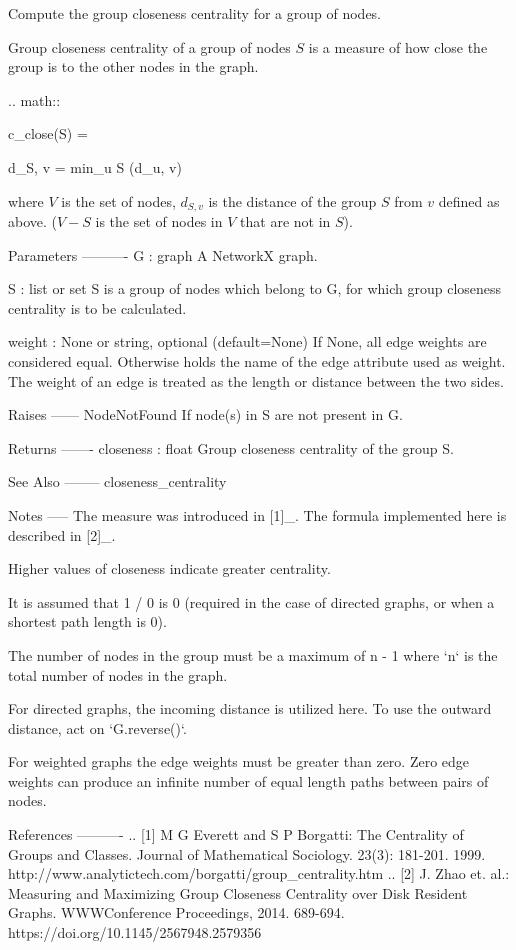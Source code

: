 \begin{DoxyVerb}Compute the group closeness centrality for a group of nodes.

Group closeness centrality of a group of nodes $S$ is a measure
of how close the group is to the other nodes in the graph.

.. math::

   c_{close}(S) = 

   d_{S, v} = min_{u \in S} (d_{u, v})

where $V$ is the set of nodes, $d_{S, v}$ is the distance of
the group $S$ from $v$ defined as above. ($V-S$ is the set of nodes
in $V$ that are not in $S$).

Parameters
----------
G : graph
   A NetworkX graph.

S : list or set
   S is a group of nodes which belong to G, for which group closeness
   centrality is to be calculated.

weight : None or string, optional (default=None)
   If None, all edge weights are considered equal.
   Otherwise holds the name of the edge attribute used as weight.
   The weight of an edge is treated as the length or distance between the two sides.

Raises
------
NodeNotFound
   If node(s) in S are not present in G.

Returns
-------
closeness : float
   Group closeness centrality of the group S.

See Also
--------
closeness_centrality

Notes
-----
The measure was introduced in [1]_.
The formula implemented here is described in [2]_.

Higher values of closeness indicate greater centrality.

It is assumed that 1 / 0 is 0 (required in the case of directed graphs,
or when a shortest path length is 0).

The number of nodes in the group must be a maximum of n - 1 where `n`
is the total number of nodes in the graph.

For directed graphs, the incoming distance is utilized here. To use the
outward distance, act on `G.reverse()`.

For weighted graphs the edge weights must be greater than zero.
Zero edge weights can produce an infinite number of equal length
paths between pairs of nodes.

References
----------
.. [1] M G Everett and S P Borgatti:
   The Centrality of Groups and Classes.
   Journal of Mathematical Sociology. 23(3): 181-201. 1999.
   http://www.analytictech.com/borgatti/group_centrality.htm
.. [2] J. Zhao et. al.:
   Measuring and Maximizing Group Closeness Centrality over
   Disk Resident Graphs.
   WWWConference Proceedings, 2014. 689-694.
   https://doi.org/10.1145/2567948.2579356
\end{DoxyVerb}
